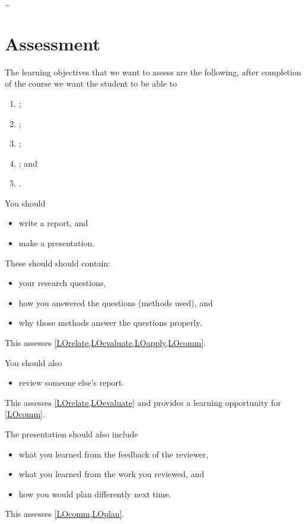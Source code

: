\dots



\section{Assessment}

The learning objectives that we want to assess are the following, after 
completion of the course we want the student to be able to
\begin{enumerate}[label={(LO\arabic*)},ref=LO\arabic*]
  \item \LOrelate;
  \item \LOevaluate;
  \item \LOapply;
  \item \LOplan; and
  \item \LOcomm.
\end{enumerate}

You should
\begin{itemize}
  \item write a report, and
  \item make a presentation.
\end{itemize}
These should should contain:
\begin{itemize}
  \item your research questions,
  \item how you answered the questions (methods used), and
  \item why those methods answer the questions properly.
\end{itemize}
This assesses \cref{LOrelate,LOevaluate,LOapply,LOcomm}.

You should also
\begin{itemize}
  \item review someone else's report.
\end{itemize}
This assesses \cref{LOrelate,LOevaluate} and provides a learning opportunity 
for \cref{LOcomm}.

The presentation should also include
\begin{itemize}
  \item what you learned from the feedback of the reviewer,
  \item what you learned from the work you reviewed, and
  \item how you would plan differently next time.
\end{itemize}
This assesses \cref{LOcomm,LOplan}.

